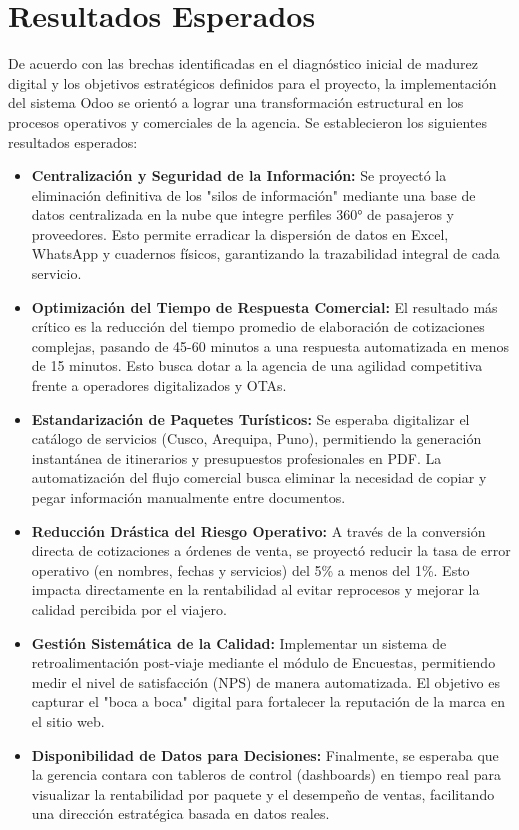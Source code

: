\section{Resultados Esperados}

De acuerdo con las brechas identificadas en el diagnóstico inicial de madurez digital y los objetivos estratégicos definidos para el proyecto, la implementación del sistema Odoo se orientó a lograr una transformación estructural en los procesos operativos y comerciales de la agencia. Se establecieron los siguientes resultados esperados:

\begin{itemize}
    \item \textbf{Centralización y Seguridad de la Información:} Se proyectó la eliminación definitiva de los "silos de información" mediante una base de datos centralizada en la nube que integre perfiles 360° de pasajeros y proveedores. Esto permite erradicar la dispersión de datos en Excel, WhatsApp y cuadernos físicos, garantizando la trazabilidad integral de cada servicio.
    \item \textbf{Optimización del Tiempo de Respuesta Comercial:} El resultado más crítico es la reducción del tiempo promedio de elaboración de cotizaciones complejas, pasando de 45-60 minutos a una respuesta automatizada en menos de 15 minutos. Esto busca dotar a la agencia de una agilidad competitiva frente a operadores digitalizados y OTAs.
    \item \textbf{Estandarización de Paquetes Turísticos:} Se esperaba digitalizar el catálogo de servicios (Cusco, Arequipa, Puno), permitiendo la generación instantánea de itinerarios y presupuestos profesionales en PDF. La automatización del flujo comercial busca eliminar la necesidad de copiar y pegar información manualmente entre documentos.
    \item \textbf{Reducción Drástica del Riesgo Operativo:} A través de la conversión directa de cotizaciones a órdenes de venta, se proyectó reducir la tasa de error operativo (en nombres, fechas y servicios) del 5\% a menos del 1\%. Esto impacta directamente en la rentabilidad al evitar reprocesos y mejorar la calidad percibida por el viajero.
    \item \textbf{Gestión Sistemática de la Calidad:} Implementar un sistema de retroalimentación post-viaje mediante el módulo de Encuestas, permitiendo medir el nivel de satisfacción (NPS) de manera automatizada. El objetivo es capturar el "boca a boca" digital para fortalecer la reputación de la marca en el sitio web.
    \item \textbf{Disponibilidad de Datos para Decisiones:} Finalmente, se esperaba que la gerencia contara con tableros de control (dashboards) en tiempo real para visualizar la rentabilidad por paquete y el desempeño de ventas, facilitando una dirección estratégica basada en datos reales.
\end{itemize}
